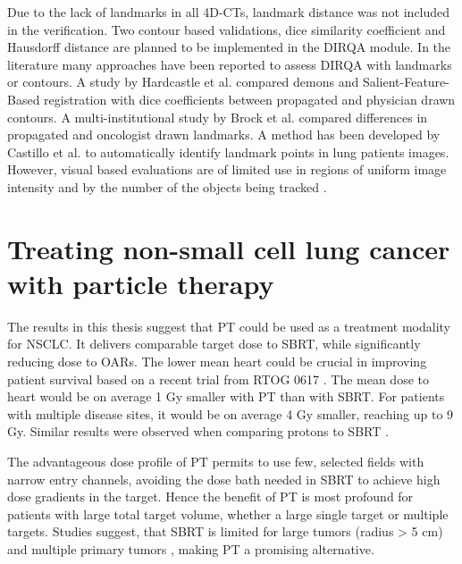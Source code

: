 \documentclass[type=dr, dr=rernat, accentcolor=tud7b,colorbacktitle, bigchapter, openright, twoside, 12pt ]{tudthesis}
\begin{document}

Due to the lack of landmarks in all 4D-CTs, landmark distance was not included in the verification. Two contour based validations, dice similarity coefficient \cite{Varadhan2013} and Hausdorff distance \cite{Huttenlocher1993}
are planned to be implemented in the DIRQA module. In the literature many approaches have been reported to assess DIRQA with landmarks or contours. 
A study by Hardcastle et al. \cite{Hardcastle2012} 
compared demons and Salient-Feature-Based registration with dice coefficients between propagated and physician drawn contours.
A multi-institutional study by Brock et al. \cite{Brock2010} compared differences in propagated and oncologist drawn landmarks. 
A method has been developed by Castillo et al. \cite{Castillo2009} to automatically identify landmark points
in lung patients images. However, visual based evaluations are of limited use in regions of uniform image intensity and by the number of the objects being tracked \cite{Kashani2008, Liu2012}.



\newpage
\section{Treating non-small cell lung cancer with particle therapy}

The results in this thesis suggest that PT could be used as a treatment modality for NSCLC. It delivers comparable target dose to SBRT, while significantly reducing 
dose to OARs. The lower mean heart could be crucial in improving patient survival based on a recent trial from RTOG 0617 \cite{Bradley2015}. 
The mean dose to heart would be on average 1 Gy smaller with PT than with SBRT. 
For patients with multiple disease sites, it would be on average 4 Gy smaller, reaching up to 9 Gy. Similar results were observed when comparing protons to SBRT \cite{Georg2008}. 

The advantageous dose profile of PT permits to use few, selected fields with narrow entry channels, avoiding the dose bath needed in SBRT
to achieve high dose gradients in the target.
Hence the benefit of PT is most profound for patients with large total target volume, whether a large single target or multiple targets. Studies suggest, that SBRT is limited for large
tumors (radius > 5 cm) and multiple primary tumors \cite{Timmerman2006, Georg2008, Westover2012}, making PT a promising alternative.
\end{document}
